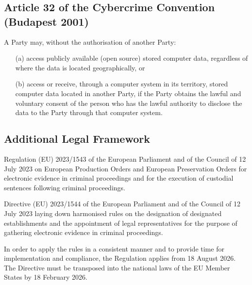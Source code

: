 \subsection{Article 32 of the Cybercrime Convention (Budapest 2001)}
A Party may, without the authorisation of another Party:
\begin{itemize}
  \item[(a)] access publicly available (open source) stored computer data, regardless of where the data is located geographically, or
  \item[(b)] access or receive, through a computer system in its territory, stored computer data located in another Party, if the Party obtains the lawful and voluntary consent of the
    person who has the lawful authority to disclose the data to the Party through that computer system.
\end{itemize}

\subsection{Additional Legal Framework}

Regulation (EU) 2023/1543 of the European Parliament and of the 
Council of 12 July 2023 on European Production Orders and European 
Preservation Orders for electronic evidence in criminal proceedings 
and for the execution of custodial sentences following criminal 
proceedings.


Directive (EU) 2023/1544 of the European Parliament and of the 
Council of 12 July 2023 laying down harmonised rules on the 
designation of designated establishments and the appointment of 
legal representatives for the purpose of gathering electronic 
evidence in criminal proceedings.

In order to apply the rules in a consistent manner and to provide 
time for implementation and compliance, the Regulation applies 
from 18 August 2026. The Directive must be transposed into the 
national laws of the EU Member States by 18 February 2026.

